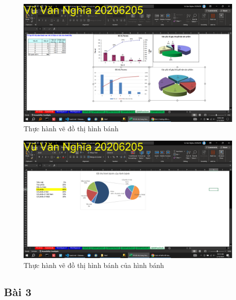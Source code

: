 \documentclass{article}
\begin{document}
\begin{figure}[H]
\centering
\includegraphics[scale = 0.15]{Bai2/ThucHanh/2.png}
\caption{Thực hành vẽ đồ thị hình bánh}
\end{figure}

\begin{figure}[H]
\centering
\includegraphics[scale = 0.15]{Bai2/ThucHanh/3.png}
\caption{Thực hành vẽ đồ thị hình bánh của hình bánh}
\end{figure}

\subsection{Bài 3}

\end{document}
